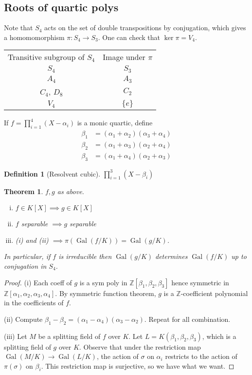 \documentclass{article}
\theoremstyle{definition}
\newtheorem*{defn*}{Definition}
\theoremstyle{remark}
\theoremstyle{plain}
\newtheorem{thm}[defn]{Theorem}
\newcommand{\ZZ}{\mathbb{Z}}
\newcommand{\Gal}{\operatorname{Gal}}
\begin{document}
\subsection{Roots of quartic polys}
Note that $S_4$ acts on the set of double transpositions by conjugation, which gives a homomomorphism $\pi:S_4\to S_3$.
One can check that $\ker \pi=V_4$.
\begin{table}[H]
    \centering
    \begin{tabular}{|c|c|}
       Transitive subgroup of $S_4$  & Image under $\pi$  \\
        $S_4$ & $S_3$\\ \hline
        $A_4$ & $A_3$\\ \hline
        $C_4$, $D_8$ & $C_2$\\ \hline
        $V_4$ & $\{e\}$\\ \hline
    \end{tabular}
\end{table}
If $f=\prod_{i=1}^4(X-\alpha_i)$ is a monic quartic, define 
\begin{align*}
    \beta_1&=(\alpha_1+\alpha_2)(\alpha_3+\alpha_4)\\
    \beta_2&=(\alpha_1+\alpha_3)(\alpha_2+\alpha_4)\\
    \beta_3&=(\alpha_1+\alpha_4)(\alpha_2+\alpha_3)
\end{align*}
\begin{defn*}[Resolvent cubic]
    $\prod_{i=1}^3(X-\beta_i)$
\end{defn*}
\begin{thm}
    $f,g$ as above. \begin{enumerate}[(i)]
        \item $f\in K[X]\implies g\in K[X]$
        \item $f$ separable $\implies g$ separable
        \item (i) and (ii) $\implies \pi(\Gal(f/K))=\Gal(g/K)$.
    \end{enumerate}
    In particular, if $f$ is irreducible then $\Gal(g/K)$ determines $\Gal(f/K)$ up to conjugation in $S_4$.
\end{thm}
\begin{proof}
    (i) Each coeff of $g$ is a sym poly in $\ZZ[\beta_1,\beta_2,\beta_3]$ hence symmetric in $\ZZ[\alpha_1,\alpha_2,\alpha_3,\alpha_4]$. By symmetric function theorem, $g$ is a $\ZZ$-coefficient polynomial in the coefficients of $f$.

    (ii) Compute $\beta_1-\beta_2=(\alpha_1-\alpha_4)(\alpha_3-\alpha_2)$. Repeat for all combination.

    (iii) Let $M$ be a splitting field of $f$ over $K$. Let $L=K(\beta_1,\beta_2,\beta_3)$, which is a splitting field of $g$ over $K$. Observe that under the restriction map $\Gal(M/K)\to \Gal(L/K)$, the action of $\sigma$ on $\alpha_i$ restricts to the action of $\pi(\sigma)$ on $\beta_i$. This restriction map is surjective, so we have what we want.
\end{proof}
\end{document}
